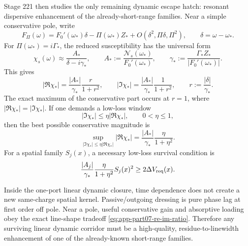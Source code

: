 Stage 221 then studies the only remaining dynamic escape hatch: resonant dispersive enhancement of the already-short-range families.  Near a simple conservative pole, write
\begin{equation}
\label{eq:app-part07-simple-pole-denominator}
F_\Pi(\omega)=F_0'(\omega_*)\delta-\Pi(\omega_*)Z_*+O(\delta^2,\Pi\delta,\Pi^2),
\qquad
\delta=\omega-\omega_*.
\end{equation}
For \(\Pi(\omega_*)=i\Gamma_*\), the reduced susceptibility has the universal form
\begin{equation}
\label{eq:app-part07-breit-wigner}
\chi_s(\omega)\approx\frac{A_*}{\delta-i\gamma_*},
\qquad
A_*:=\frac{\mathcal N_s(\omega_*)}{F_0'(\omega_*)},
\qquad
\gamma_*:=\frac{\Gamma_*Z_*}{|F_0'(\omega_*)|}.
\end{equation}
This gives
\begin{equation}
\label{eq:app-part07-re-im-ratio}
|\Re\chi_*|=\frac{|A_*|}{\gamma_*}\frac{r}{1+r^2},
\qquad
|\Im\chi_*|=\frac{|A_*|}{\gamma_*}\frac1{1+r^2},
\qquad
r:=\frac{|\delta|}{\gamma_*}.
\end{equation}
The exact maximum of the conservative part occurs at \(r=1\), where \(|\Re\chi_*|=|\Im\chi_*|\).  If one demands a low-loss window
\begin{equation}
\label{eq:app-part07-low-loss-window}
|\Im\chi_*|\le\eta|\Re\chi_*|,
\qquad
0<\eta\le1,
\end{equation}
then the best possible conservative magnitude is
\begin{equation}
\label{eq:app-part07-low-loss-bound}
\sup_{|\Im\chi_*|\le\eta|\Re\chi_*|}|\Re\chi_*|
=
\frac{|A_*|}{\gamma_*}\frac{\eta}{1+\eta^2}.
\end{equation}
For a spatial family \(S_j(x)\), a necessary low-loss survival condition is
\begin{equation}
\label{eq:app-part07-linear-survival-window}
\frac{|A_j|}{\gamma_*}\frac{\eta}{1+\eta^2}S_j(x)^2
\ge
2\Delta V_{\rm req}(x).
\end{equation}

\begin{theorem}
\label{thm:app-part07-dynamic-no-free-lunch}
Inside the one-port linear dynamic closure, time dependence does not create a new same-charge spatial kernel.  Passive/outgoing dressing is pure phase lag at first order off pole.  Near a pole, useful conservative gain and absorptive loading obey the exact line-shape tradeoff \cref{eq:app-part07-re-im-ratio}.  Therefore any surviving linear dynamic corridor must be a high-quality, residue-to-linewidth enhancement of one of the already-known short-range families.
\end{theorem}


